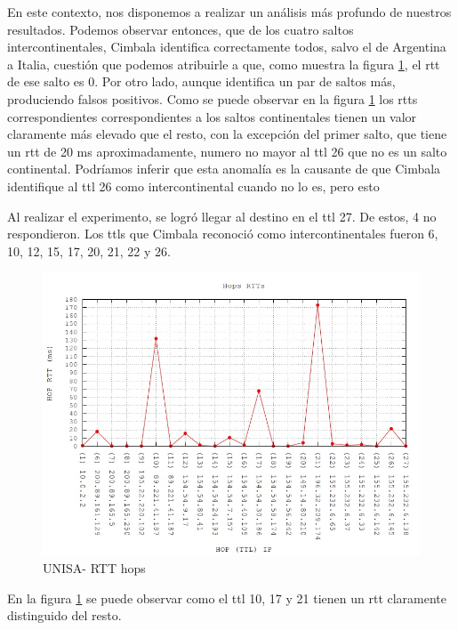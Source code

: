 En este contexto, nos disponemos a realizar un análisis más profundo de nuestros resultados. Podemos observar entonces, que de los cuatro saltos intercontinentales, Cimbala identifica correctamente todos, salvo el de Argentina a Italia, cuestión que podemos atribuirle a que, como muestra la figura \ref{fig:1}, el rtt de ese salto es 0. Por otro lado, 
 aunque identifica un par de saltos más, produciendo falsos positivos. Como se puede observar en la figura \ref{fig:1} los rtts correspondientes correspondientes a los saltos continentales tienen un valor claramente más elevado que el resto, con la excepción del primer salto, que tiene un rtt de 20 ms aproximadamente, numero no mayor al ttl 26 que no es un salto continental. Podríamos inferir que esta anomalía es la causante de que Cimbala identifique al ttl 26 como intercontinental cuando no lo es, pero esto

Al realizar el experimento, se logró llegar al destino en el ttl 27. De estos, 4 no respondieron. Los ttls que Cimbala reconoció como intercontinentales fueron 6, 10, 12, 15, 17, 20, 21, 22 y 26.

\begin{figure}[!htbp]
  \centering
    \includegraphics[scale=0.6]{imagenes/unisa-graficos/traceroute-unisa.jpg}
  \caption{UNISA- RTT hops}
  \label{fig:1}
\end{figure}

En la figura \ref{fig:1} se puede observar como el ttl 10, 17 y 21 tienen un rtt claramente distinguido del resto.

